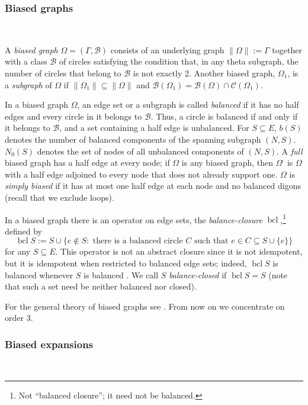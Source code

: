 \documentclass[reqno,12pt]{amsart}
\theoremstyle{remark}
\numberwithin{equation}{section}
\numberwithin{figure}{section}
\newcommand \bcl{\operatorname{bcl}}
\newcommand \full{^{{}^{{}_{{}_\bullet}}\!}}
\newcommand \cB{\mathcal{B}}
\newcommand \cC{\mathcal{C}}
\begin{document}
\subsubsection{Biased graphs}\label{bgbasics}\

A \emph{biased graph} $\Omega = (\Gamma,\cB)$ consists of an underlying graph $\|\Omega\| := \Gamma$ together with a class $\cB$ of circles satisfying the condition that, in any theta subgraph, the number of circles that belong to $\cB$ is not exactly 2.  
Another biased graph, $\Omega_1$, is a \emph{subgraph} of $\Omega$ if $\| \Omega_1 \| \subseteq \| \Omega \|$ and $\cB(\Omega_1) = \cB(\Omega) \cap \cC(\Omega_1)$.

In a biased graph $\Omega$, an edge set or a subgraph is called \emph{balanced} if it has no half edges and every circle in it belongs to $\cB$.  Thus, a circle is balanced if and only if it belongs to $\cB$, and a set containing a half edge is unbalanced.  For $S \subseteq E$, $b(S)$ denotes the number of balanced components of the spanning subgraph $(N,S)$.  $N_0(S)$ denotes the set of nodes of all unbalanced components of $(N,S)$.  
A \emph{full} biased graph has a half edge at every node; if $\Omega$ is any biased graph, then $\Omega\full$ is $\Omega$ with a half edge adjoined to every node that does not already support one.
$\Omega$ is \emph{simply biased} if it has at most one half edge at each node and no balanced digons (recall that we exclude loops).  

In a biased graph there is an operator on edge sets, the \emph{balance-closure} $\bcl$,\footnote{Not ``balanced closure''; it need not be balanced.} defined by 
$$
\bcl S := S \cup \{ e \notin S : \text{ there is a balanced circle $C$ such that } e \in C \subseteq S \cup \{e\} \}
$$
for any $S \subseteq E$.  This operator is not an abstract closure since it is not idempotent, but it is idempotent when restricted to balanced edge sets; indeed, $\bcl S$ is balanced whenever $S$ is balanced \cite[Proposition I.3.1]{BG}.  We call $S$ \emph{balance-closed} if $\bcl S = S$ (note that such a set need be neither balanced nor closed).

For the general theory of biased graphs see \cite{BG}.  From now on we concentrate on order 3.

\subsubsection{Biased expansions}\label{bx3}\
\end{document}
